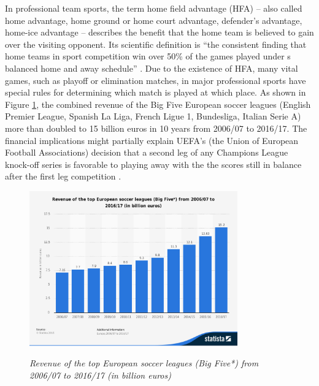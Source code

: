 \documentclass[USenglish]{article}
\begin{document}
In professional team sports, the term home field advantage (HFA) – also called home advantage, home ground or home court advantage, defender's advantage, home-ice advantage – describes the benefit that the home team is believed to gain over the visiting opponent. Its scientific definition is ``the consistent finding that home teams in sport competition win over 50\% of the games played under s balanced home and away schedule'' \citep[p. 13]{Courneya1992}.
Due to the existence of HFA, many vital games, such as playoff or elimination matches, in major professional sports have special rules for determining which match is played at which place.  As shown in Figure \ref{fig11}, the combined revenue of the Big Five European soccer leagues (English Premier League, Spanish La Liga, French Ligue 1, Bundesliga, Italian Serie A) more than doubled to 15 billion euros in 10 years from 2006/07 to 2016/17. The financial implications might partially explain UEFA's (the Union of European Football Associations) decision that a second leg of any Champions League knock-off series is favorable to playing away with the the scores still in balance after the first leg competition \citep{atkins2013}.

\begin{figure}[ht]
\caption{\textit{Revenue of the top European soccer leagues (Big Five*) from 2006/07 to 2016/17 (in billion euros)}}
\centering\includegraphics[width=0.8\textwidth]{HFA11.pdf}
\label{fig11}
\end{figure}



\end{document}
